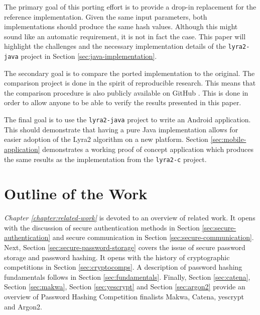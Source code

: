 The primary goal of this porting effort is to provide a drop-in replacement for the reference implementation. Given the same input parameters, both implementations should produce the same hash values. Although this might sound like an automatic requirement, it is not in fact the case. This paper will highlight the challenges and the necessary implementation details of the \texttt{lyra2-java} project in Section \ref{sec:java-implementation}.

The secondary goal is to compare the ported implementation to the original. The comparison project is done in the spirit of reproducible research. This means that the comparison procedure is also publicly available on GitHub \cite{github:2017:lyra2-compare}. This is done in order to allow anyone to be able to verify the results presented in this paper.

The final goal is to use the \texttt{lyra2-java} project to write an Android application. This should demonstrate that having a pure Java implementation allows for easier adoption of the Lyra2 algorithm on a new platform. Section \ref{sec:mobile-application} demonstrates a working proof of concept application which produces the same results as the implementation from the \texttt{lyra2-c} project.

\section{Outline of the Work}

\emph{Chapter \ref{chapter:related-work}} is devoted to an overview of related work. It opens with the discussion of secure authentication methods in Section \ref{sec:secure-authentication} and secure communication in Section \ref{sec:secure-communication}. Next, Section \ref{sec:secure-password-storage} covers the issue of secure password storage and password hashing. It opens with the history of cryptographic competitions in Section \ref{sec:cryptocomps}. A description of password hashing fundamentals follows in Section \ref{sec:fundamentals}. Finally, Section \ref{sec:catena}, Section \ref{sec:makwa}, Section \ref{sec:yescrypt} and Section \ref{sec:argon2} provide an overview of Password Hashing Competition finalists Makwa, Catena, yescrypt and Argon2.

